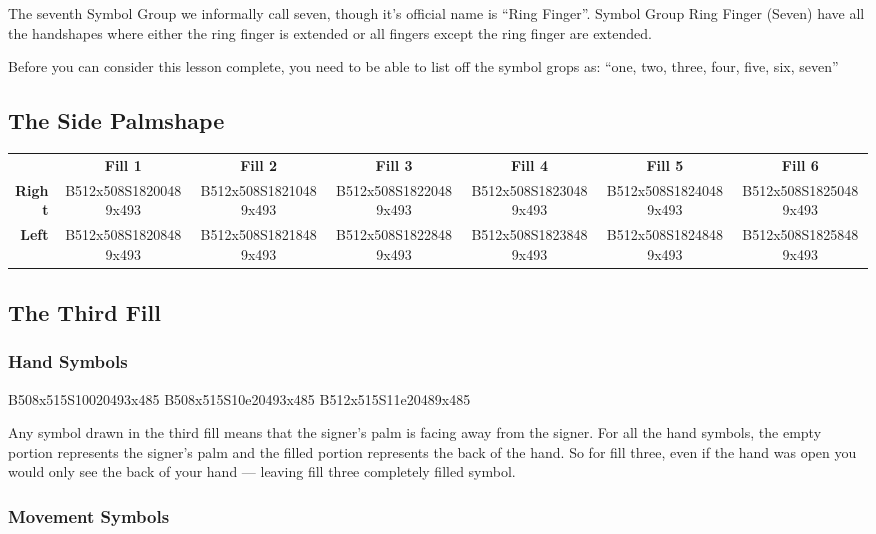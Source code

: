 \documentclass{article}
\begin{document}
The seventh Symbol Group we informally call seven, though it's official name is ``Ring Finger''.
Symbol Group Ring Finger (Seven) have all the handshapes where either the ring finger is extended or all fingers except the ring finger are extended.

Before you can consider this lesson complete, you need to be able to list off the symbol grops as:
``one, two, three, four, five, six, seven''

\subsection{The Side Palmshape}

\begin{center}
\begin{tabular}{r*{6}{c}}
&\textbf{Fill 1}&\textbf{Fill 2}&\textbf{Fill 3}&\textbf{Fill 4}&\textbf{Fill 5}&\textbf{Fill 6}\\
\textbf{Right}&
B512x508S18200489x493&
B512x508S18210489x493&
B512x508S18220489x493&
B512x508S18230489x493&
B512x508S18240489x493&
B512x508S18250489x493\\
\textbf{Left}&
B512x508S18208489x493&
B512x508S18218489x493&
B512x508S18228489x493&
B512x508S18238489x493&
B512x508S18248489x493&
B512x508S18258489x493\\
\end{tabular}
\end{center}

\subsection{The Third Fill}

\subsubsection{Hand Symbols}

\begin{center}
B508x515S10020493x485 B508x515S10e20493x485 B512x515S11e20489x485
\end{center}

Any symbol drawn in the third fill means that the signer's palm is facing away from the signer.
For all the hand symbols, the empty portion represents the signer's palm and the filled portion represents the back of the hand.
So for fill three, even if the hand was open you would only see the back of your hand --- leaving fill three completely filled symbol.

\subsubsection{Movement Symbols}
\end{document}
